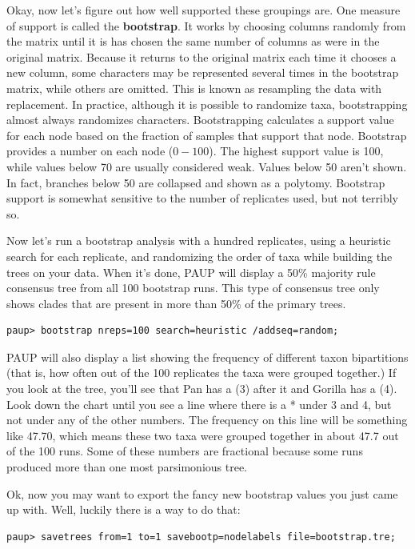 \documentclass[11pt]{article}
\begin{document}
Okay, now let's figure out how well supported these groupings are. One measure of support is called the 
\textbf{bootstrap}. 
It works by choosing columns randomly from the matrix until it is has chosen the same number of columns as were in the original matrix. Because it returns to the original matrix each time it chooses a new column, some characters may be
represented several times in the bootstrap matrix, while others are omitted. This is known as resampling the data with replacement. In practice, although it is possible to randomize taxa, bootstrapping almost always randomizes characters. Bootstrapping calculates a support value for each node based on the fraction of samples that support that node. 
Bootstrap provides a number on each node ($0-100$). 
The highest support value is 100, while values below 70 are usually considered weak. Values below 50 aren't shown. In fact, branches below 50 are collapsed and shown as a polytomy. Bootstrap support is somewhat sensitive to the number of replicates used, but not terribly so.


Now let's run a bootstrap analysis with a hundred replicates, using a heuristic search for each replicate, 
and randomizing the order of taxa while building the trees on your data.
When it's done, PAUP will display a 50\% 
majority rule consensus tree from all 100 bootstrap runs. 
This type of consensus tree only shows clades that are present in more than 50\% of the primary trees.

\begin{verbatim}
paup> bootstrap nreps=100 search=heuristic /addseq=random;
\end{verbatim}

PAUP will also display a list showing the frequency of different taxon bipartitions (that is, how often out of the 100 replicates the taxa were grouped together.) 
If you look at the tree, you’ll see that Pan has a (3) after it and Gorilla has a (4). 
Look down the chart until you see a line where there is a * under 3 and 4, 
but not under any of the other numbers. 
The frequency on this line will be something like 47.70, 
which means these two taxa were grouped together in about 47.7 out of the 100 runs. 
Some of these numbers are fractional because some runs 
produced more than one most parsimonious tree.

Ok, now you may want to export the fancy new bootstrap values you just came up with. Well, luckily there is a way to do that:

\begin{verbatim}
paup> savetrees from=1 to=1 savebootp=nodelabels file=bootstrap.tre;
\end{verbatim}
\end{document}
